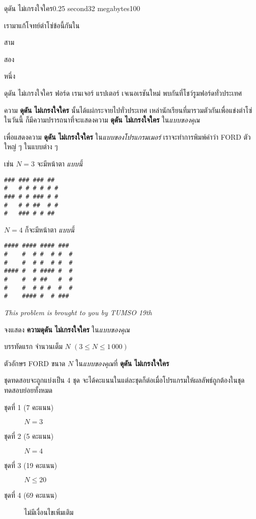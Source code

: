 \documentclass[11pt,a4paper]{article}
\begin{document}
 
\begin{problem}{ดุดัน ไม่เกรงใจใคร}{}{}{0.25 second}{32 megabytes}{100}
 
เรามาแก้โจทย์ตำโซ่ข้อนี้กันใน

สาม

สอง

หนึ่ง

ดุดัน ไม่เกรงใจใคร ฟอร์ด เรนเจอร์ แรปเตอร์ เจเนอเรชันใหม่ พบกันที่โชว์รูมฟอร์ดทั่วประเทศ

ความ \textbf{ดุดัน ไม่เกรงใจใคร} นั้นได้แผ่กระจายไปทั่วประเทศ เหล่านักเรียนที่มารวมตัวกันเพื่อแข่งตำโซ่ในวันนี้ ก็มีความปรารถนาที่จะแสดงความ \textbf{ดุดัน ไม่เกรงใจใคร} ใน\textit{แบบของคุณ}

เพื่อแสดงความ \textbf{ดุดัน ไม่เกรงใจใคร} ใน\textit{แบบของโปรแกรมเมอร์} เราจะทำการพิมพ์คำว่า FORD ตัวใหญ่ ๆ ในแบบต่าง ๆ

เช่น $N = 3$ จะมีหน้าตา \textit{แบบนี้}

\begin{verbatim}
### ### ### ##
#   # # # # # #
### # # ### # #
#   # # ##  # #
#   ### # # ##
\end{verbatim}

$N = 4$ ก็จะมีหน้าตา \textit{แบบนี้}
\begin{verbatim}
#### #### #### ###
#    #  # #  # #  #
#    #  # #  # #  #
#### #  # #### #  #
#    #  # ##   #  #
#    #  # # #  #  #
#    #### #  # ###
\end{verbatim}

\textit{This problem is brought to you by TUMSO 19th}

\YourWork

จงแสดง \textbf{ความดุดัน ไม่เกรงใจใคร} ใน\textit{แบบของคุณ}

\pagebreak

\InputFile
 
บรรทัดแรก จำนวนเต็ม $N$ $(3 \leq N \leq 1\,000)$ 
 
\OutputFile

ตัวอักษร FORD ขนาด $N$ ใน\textit{แบบของคุณ}ที่ \textbf{ดุดัน ไม่เกรงใจใคร}
 
\Scoring
ชุดทดสอบจะถูกแบ่งเป็น 4 ชุด จะได้คะแนนในแต่ละชุดก็ต่อเมื่อโปรแกรมให้ผลลัพธ์ถูกต้องในชุดทดสอบย่อยทั้งหมด
 
\begin{description}
\item[ชุดที่ 1 (7 คะแนน)] $N = 3$
\item[ชุดที่ 2 (5 คะแนน)] $N = 4$
\item[ชุดที่ 3 (19 คะแนน)] $N \leq 20$
\item[ชุดที่ 4 (69 คะแนน)] ไม่มีเงื่อนไขเพิ่มเติม
\end{description}
 
\end{problem}
 
\end{document}
